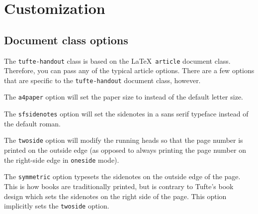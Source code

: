 \documentclass[twoside]{tufte-handout}
\begin{document}
\section{Customization}\label{sec:customization}
\subsection{Document class options}\label{sec:options}
The \Verb|tufte-handout| class is based on the \LaTeX\ \Verb|article|
document class.  Therefore, you can pass any of the typical article
options.  There are a few options that are specific to the
\Verb|tufte-handout| document class, however.

The \Verb|a4paper| option will set the paper size to  instead of
the default  letter size.

The \Verb|sfsidenotes| option will set the sidenotes in a \textsf{sans
serif} typeface instead of the default roman.

The \Verb|twoside| option will modify the running heads so that the page
number is printed on the outside edge (as opposed to always printing the page
number on the right-side edge in \Verb|oneside| mode).  

The \Verb|symmetric| option typesets the sidenotes on the outside edge of
the page.  This is how books are traditionally printed, but is contrary to
Tufte's book design which sets the sidenotes on the right side of the page.
This option implicitly sets the \Verb|twoside| option.
\end{document}
